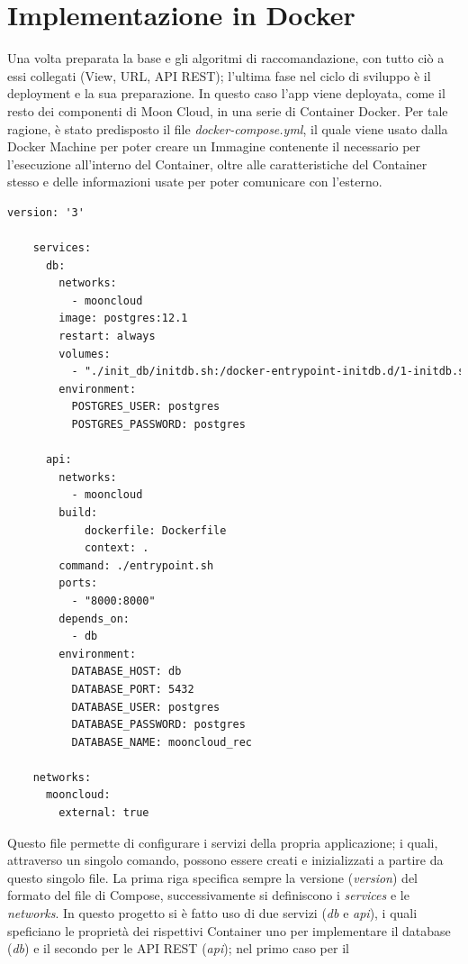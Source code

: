 \section*{Implementazione in Docker}
Una volta preparata la base e gli algoritmi di raccomandazione, con tutto ciò a essi collegati (View, URL, API REST); l'ultima fase nel ciclo di sviluppo è il 
deployment e la sua preparazione. In questo caso l'app viene deployata, come il resto dei componenti di Moon Cloud, in una serie di Container Docker. Per 
tale ragione, è stato predisposto il file \textit{docker-compose.yml}, il quale viene usato dalla Docker Machine per poter creare un Immagine contenente 
il necessario per l'esecuzione all'interno del Container, oltre alle caratteristiche del Container stesso e delle informazioni usate per poter 
comunicare con l'esterno.
\lstset{style=python_code_style}
\begin{lstlisting}[language=Xml, label=lst:docker_compose, caption={Contenuto del file docker-compose.yml per il deployment del sistema di raccomandazione 
    all'interno di un Container.}]
    version: '3'

    services:
      db:
        networks:
          - mooncloud
        image: postgres:12.1
        restart: always
        volumes:
          - "./init_db/initdb.sh:/docker-entrypoint-initdb.d/1-initdb.sh"
        environment:
          POSTGRES_USER: postgres
          POSTGRES_PASSWORD: postgres
    
      api:
        networks:
          - mooncloud
        build:
            dockerfile: Dockerfile
            context: .
        command: ./entrypoint.sh
        ports:
          - "8000:8000"
        depends_on:
          - db
        environment:
          DATABASE_HOST: db
          DATABASE_PORT: 5432
          DATABASE_USER: postgres
          DATABASE_PASSWORD: postgres
          DATABASE_NAME: mooncloud_rec
    
    networks:
      mooncloud:
        external: true
\end{lstlisting}
%
Questo file permette di configurare i servizi della propria applicazione; i quali, attraverso un singolo comando, possono essere creati e inizializzati a 
partire da questo singolo file.
La prima riga specifica sempre la versione (\textit{version}) del formato del file di Compose, successivamente si definiscono i \textit{services} e 
le \textit{networks}. In questo progetto si è fatto uso di due servizi (\textit{db} e \textit{api}), i quali speficiano le 
proprietà dei rispettivi Container uno per implementare il database (\textit{db}) e il secondo per le API REST (\textit{api}); nel primo caso per il 
